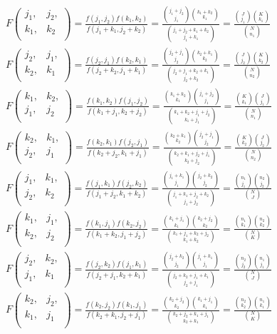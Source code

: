 \documentclass{article}
\begin{document}
\newcommand{\myhypergeo}[4]{
  F\left(\begin{array}{cc} #1, & #2, \\ #3, & #4 \\ \end{array}\right)
  =\frac{f(#1, #2)f(#3, #4)}{f(#1+#3, #2+#4)}
  =\frac{{#1+#2 \choose #1}{#3+#4 \choose #3}}{{#1+#2+#3+#4 \choose #1+#3}}
}

\begin{align*}
  \myhypergeo{j_1}{j_2}{k_1}{k_2} = \frac{{J \choose j_1}{K \choose k_1}}{{N \choose n_1}} \\
  \myhypergeo{j_2}{j_1}{k_2}{k_1} = \frac{{J \choose j_2}{K \choose k_2}}{{N \choose n_2}} \\
  \myhypergeo{k_1}{k_2}{j_1}{j_2} = \frac{{K \choose k_1}{J \choose j_1}}{{N \choose n_1}} \\
  \myhypergeo{k_2}{k_1}{j_2}{j_1} = \frac{{K \choose k_2}{J \choose j_2}}{{N \choose n_2}} \\
  \myhypergeo{j_1}{k_1}{j_2}{k_2} = \frac{{n_1 \choose j_1}{n_2 \choose j_2}}{{N \choose J}} \\
  \myhypergeo{k_1}{j_1}{k_2}{j_2} = \frac{{n_1 \choose k_1}{n_2 \choose k_2}}{{N \choose K}} \\
  \myhypergeo{j_2}{k_2}{j_1}{k_1} = \frac{{n_2 \choose j_2}{n_1 \choose j_1}}{{N \choose J}} \\
  \myhypergeo{k_2}{j_2}{k_1}{j_1} = \frac{{n_2 \choose k_2}{n_1 \choose k_1}}{{N \choose K}}
\end{align*}
\end{document}
